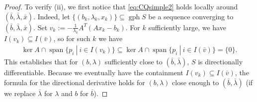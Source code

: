 \documentclass[reqno]{amsart}
\numberwithin{equation}{section}
\newcommand{\gph}{\operatorname{gph}}
\begin{document}
\begin{proof}
To verify (ii), we first notice that \eqref{eq:CQsimple2} holds locally around $(\bar{b}, \bar{\lambda}, \bar{x})$. Indeed, 
 let $\{(b_k, \lambda_k, x_k)\} \subseteq \gph S$ be a sequence converging to $(\bar{b}, \bar{\lambda}, \bar{x})$.
 Set $v_k := - \frac{1}{\lambda_k} A^T(Ax_k - b_k)$. For $k$ sufficiently large, we have $I(v_k) \subseteq I(\bar{v})$, so
 for such $k$ we have \begin{align*}
    \ker A \cap \operatorname{span} \{p_i \ | \ i \in I(v_k)\} \subseteq \ker A \cap \operatorname{span} \{p_i \ | \ i \in I(\bar{v})\} = \{0\}.
 \end{align*}
 This establishes that for $(b, \lambda)$ sufficiently close to $(\bar{b}, \bar{\lambda})$, $S$ is 
 directionally differentiable. Because we eventually have the containment $I(v_k) \subseteq I(\bar{v})$,
 the formula for the directional derivative holds for $(b, \lambda)$ close enough to $(\bar{b}, \bar{\lambda})$ (if we replace $\bar{\lambda}$ for $\lambda$ and $b$ for $\bar{b}$).


\end{proof}
\end{document}
